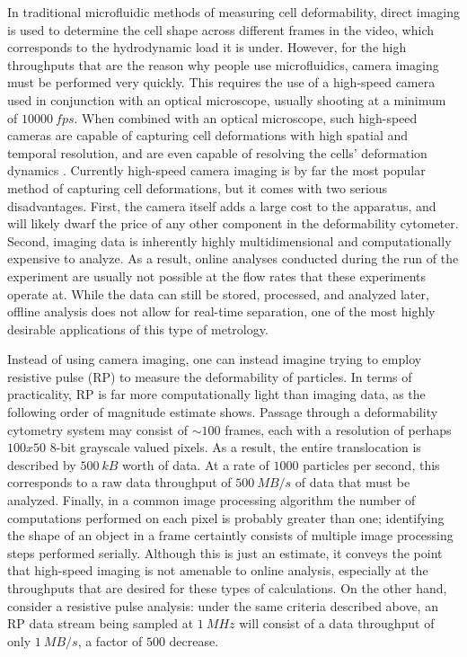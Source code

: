 		In traditional microfluidic methods of measuring cell deformability, direct imaging is used to determine the cell shape across different frames in the video, which corresponds to the hydrodynamic load it is under. However, for the high throughputs that are the reason why people use microfluidics, camera imaging must be performed very quickly. This requires the use of a high-speed camera used in conjunction with an optical microscope, usually shooting at a minimum of $\SI{10000}{fps}$. When combined with an optical microscope, such high-speed cameras are capable of capturing cell deformations with high spatial and temporal resolution, and are even capable of resolving the cells' deformation dynamics \cite{DiCarlo2017}. Currently high-speed camera imaging is by far the most popular method of capturing cell deformations, but it comes with two serious disadvantages. First, the camera itself adds a large cost to the apparatus, and will likely dwarf the price of any other component in the deformability cytometer. Second, imaging data is inherently highly multidimensional and computationally expensive to analyze. As a result, online analyses conducted during the run of the experiment are usually not possible at the flow rates that these experiments operate at. While the data can still be stored, processed, and analyzed later, offline analysis does not allow for real-time separation, one of the most highly desirable applications of this type of metrology.
		
		Instead of using camera imaging, one can instead imagine trying to employ resistive pulse (RP) to measure the deformability of particles. In terms of practicality, RP is far more computationally light than imaging data, as the following order of magnitude estimate shows. Passage through a deformability cytometry system may consist of $\sim100$ frames, each with a resolution of perhaps $100x50$ 8-bit grayscale valued pixels. As a result, the entire translocation is described by $\SI{500}{kB}$ worth of data. At a rate of $1000$ particles per second, this corresponds to a raw data throughput of $\SI{500}{MB/s}$ of data that must be analyzed. Finally, in a common image processing algorithm the number of computations performed on each pixel is probably greater than one; identifying the shape of an object in a frame certaintly consists of multiple image processing steps performed serially. Although this is just an estimate, it conveys the point that high-speed imaging is not amenable to online analysis, especially at the throughputs that are desired for these types of calculations. On the other hand, consider a resistive pulse analysis: under the same criteria described above, an RP data stream being sampled at $\SI{1}{MHz}$ will consist of a data throughput of only $\SI{1}{MB/s}$, a factor of $500$ decrease.
		
